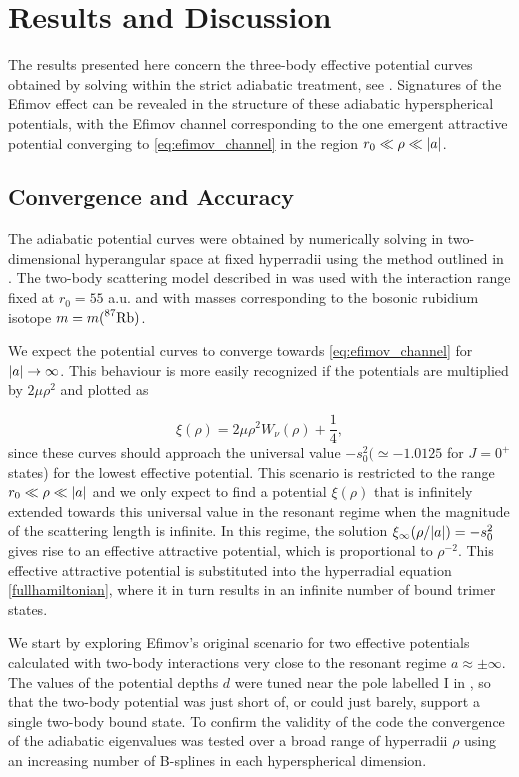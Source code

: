 \chapter{Results and Discussion}\label{chap:7}
The results presented here concern the three-body effective potential curves obtained by solving  within the strict adiabatic treatment, see . Signatures of the Efimov effect can be revealed in the structure of these adiabatic hyperspherical potentials, with the Efimov channel corresponding to the one emergent attractive potential converging to \eqref{eq:efimov_channel} in the region $r_0 \ll \rho \ll
\lvert a\rvert$.

\section{Convergence and Accuracy}
The adiabatic potential curves were obtained by numerically solving  in  two-dimensional hyperangular space at fixed hyperradii using the method outlined in . The two-body scattering model described in  was used with the interaction range fixed at $r_0=55$ a.u. and with masses corresponding to the bosonic rubidium isotope $m = m( \prescript{87}{}{\mathrm{Rb}})$. 

We expect the potential curves to converge towards \eqref{eq:efimov_channel} for $\lvert a\rvert \rightarrow \infty$. This behaviour is more easily recognized if the potentials are multiplied by $2 \mu \rho^2$ and plotted as 

\begin{equation}\label{eq:lambda}
\xi(\rho) = 2 \mu \rho^2 W_{\nu}(\rho) + \frac{1}{4},
\end{equation}
since these curves should approach the universal value $-s_0^2 (\simeq -1.0125$ for $J=0^+$ states) for the lowest effective potential. This scenario is restricted to the range $r_0 \ll \rho \ll \lvert a\rvert$ and we only expect to find a potential $\xi(\rho)$ that is infinitely extended towards this universal value in the resonant regime when the magnitude of the scattering length is infinite. In this regime, the solution $\xi_{\infty}(\rho/\lvert a\rvert) = -s_0^2$ gives rise to an effective attractive potential, which is proportional to $\rho^{-2}$. This effective attractive potential is substituted into the hyperradial equation \eqref{fullhamiltonian}, where it in turn results in an infinite number of bound trimer states.

We start by exploring Efimov's original scenario for two effective potentials calculated with two-body interactions very close to the resonant regime $a \approx \pm \infty$. The values of the potential depths $d$ were tuned near the pole labelled $\mathrm{I}$ in , so that the two-body potential was just short of, or could just barely, support a single two-body bound state. To confirm the validity of the code the convergence of the adiabatic eigenvalues was tested over a broad range of hyperradii $\rho$ using an increasing number of B-splines in each hyperspherical dimension. 

